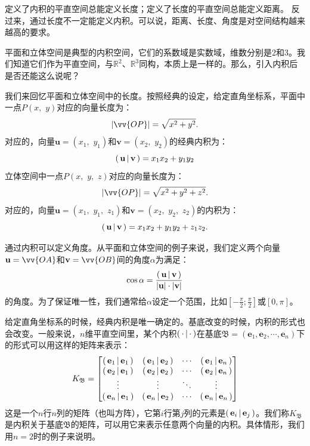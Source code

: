 \documentclass[12pt,UTF8,fontset=none]{ctexbook}
\begin{document}
定义了内积的平直空间总能定义长度；定义了长度的平直空间总能定义距离。
反过来，通过长度不一定能定义内积。可以说，距离、长度、角度是对空间结构越来越高的要求。

平面和立体空间是典型的内积空间，它们的系数域是实数域，维数分别是$2$和$3$。我们知道它们作为平直空间，与$\mathbb{R}^2$、$\mathbb{R}^3$同构，本质上是一样的。那么，引入内积后是否还能这么说呢？

我们来回忆平面和立体空间中的长度。按照经典的设定，给定直角坐标系，平面中一点$P(x, \,\,y)$对应的向量长度为：
$$ | \vv{OP} | = \sqrt{x^2 + y^2}.$$
对应的，向量$\mathbf{u} = (x_1, \,\,y_1)$和$\mathbf{v} = (x_2, \,\,y_2)$的经典内积为：
$$ \displaystyle\left( \,\mathbf{u} \,\middle\vert \,\mathbf{v} \,\right) = x_1x_2 + y_1y_2 $$
立体空间中一点$P(x, \,\,y, \,\,z)$对应的向量长度为：
$$ | \vv{OP} | = \sqrt{x^2 + y^2 + z^2}.$$
对应的，向量$\mathbf{u} = (x_1, \,\,y_1,\,\,z_1)$和$\mathbf{v} = (x_2, \,\,y_2,\,\,z_2)$的内积为：
$$ \displaystyle\left( \,\mathbf{u} \,\middle\vert \,\mathbf{v} \,\right) = x_1x_2 + y_1y_2 + z_1z_2.$$

通过内积可以定义角度。从平面和立体空间的例子来说，我们定义两个向量$\mathbf{u} = \vv{OA}$和$\mathbf{v} = \vv{OB}$间的角度$\alpha$为满足：
$$ \cos{\alpha } = \frac{\displaystyle\left( \,\mathbf{u} \,\middle\vert \,\mathbf{v} \,\right)}{|\mathbf{u}|\cdot|\mathbf{v}|}$$
的角度。为了保证唯一性，我们通常给$\alpha$设定一个范围，比如$\left[-\frac{\pi}{2};\frac{\pi}{2}\right]$或$[0,\pi]$。

给定直角坐标系的时候，经典内积是唯一确定的。基底改变的时候，内积的形式也会改变。一般来说，$n$维平直空间里，某个内积$\displaystyle\left( \,\cdot \,\middle\vert \,\cdot \,\right)$在基底$\mathfrak{B} = (\mathbf{e}_1, \mathbf{e}_2, \cdots, \mathbf{e}_n)$下的形式可以用这样的矩阵来表示：
$$ K_{\mathfrak{B}} = \begin{bmatrix}
    \displaystyle\left( \,\mathbf{e}_1 \,\middle\vert \,\mathbf{e}_1 \,\right) & \displaystyle\left( \,\mathbf{e}_1 \,\middle\vert \,\mathbf{e}_2 \,\right) & \cdots & \displaystyle\left( \,\mathbf{e}_1 \,\middle\vert \,\mathbf{e}_n \,\right) \\ \displaystyle\left( \,\mathbf{e}_2 \,\middle\vert \,\mathbf{e}_1 \,\right) & \displaystyle\left( \,\mathbf{e}_2 \,\middle\vert \,\mathbf{e}_2 \,\right) & \cdots & \displaystyle\left( \,\mathbf{e}_2 \,\middle\vert \,\mathbf{e}_n \,\right) \\ \vdots & \vdots & \ddots & \vdots \\ \displaystyle\left( \,\mathbf{e}_n \,\middle\vert \,\mathbf{e}_1 \,\right) & \displaystyle\left( \,\mathbf{e}_n \,\middle\vert \,\mathbf{e}_2 \,\right) & \cdots & \displaystyle\left( \,\mathbf{e}_n \,\middle\vert \,\mathbf{e}_n \,\right) 
\end{bmatrix} $$
这是一个$n$行$n$列的矩阵（也叫方阵），它第$i$行第$j$列的元素是$\displaystyle\left( \,\mathbf{e}_i \,\middle\vert \,\mathbf{e}_j \,\right)$。我们称$K_{\mathfrak{B}}$是内积关于基底$\mathfrak{B}$的矩阵，可以用它来表示任意两个向量的内积。具体情形，我们用$n=2$时的例子来说明。
\end{document}
